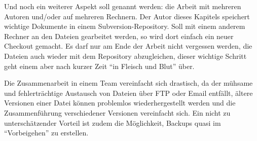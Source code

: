 Und noch ein weiterer Aspekt soll genannt werden: die Arbeit mit mehreren Autoren und/oder auf mehreren Rechnern. Der Autor dieses Kapitels speichert wichtige Dokumente in einem Subversion-Repository. Soll mit einem anderem Rechner an den Dateien gearbeitet werden, so wird dort einfach ein neuer Checkout gemacht. Es darf nur am Ende der Arbeit nicht vergessen werden, die Dateien auch wieder mit dem Repository abzugleichen, dieser wichtige Schritt geht einem aber nach kurzer Zeit \enquote{in Fleisch und Blut} über.

Die Zusammenarbeit in einem Team vereinfacht sich drastisch, da der mühsame und fehlerträchtige Austausch von Dateien über FTP oder Email entfällt, ältere Versionen einer Datei können problemlos wiederhergestellt werden und die Zusammenführung verschiedener Versionen vereinfacht sich. Ein nicht zu unterschätzender Vorteil ist zudem die Möglichkeit, Backups quasi im \enquote{Vorbeigehen} zu erstellen.

